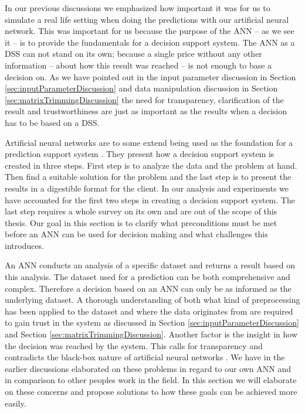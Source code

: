 In our previous discussions we emphasized how important it was for us to simulate a real life setting when doing the predictions with our artificial neural network. This was important for us because the purpose of the ANN -- as we see it -- is to provide the fundamentals for a decision support system. The ANN as a DSS can not stand on its own; because a single price without any other information -- about how this result was reached -- is not enough to base a decision on. As we have pointed out in the input parameter discussion in Section \ref{sec:inputParameterDiscussion} and data manipulation discussion in Section \ref{sec:matrixTrimmingDiscussion} the need for transparency, clarification of the result and trustworthiness are just as important as the results when a decision has to be based on a DSS.

Artificial neural networks are to some extend being used as the foundation for a prediction support system \cite{shim2002past}. They present how a decision support system is created in three steps. First step is to analyze the data and the problem at hand. Then find a suitable solution for the problem and the last step is to present the results in a digestible format for the client. In our analysis and experiments we have accounted for the first two steps in creating a decision support system. The last step requires a whole survey on its own and are out of the scope of this thesis. Our goal in this section is to clarify what preconditions must be met before an ANN can be used for decision making and what challenges this introduces.

An ANN conducts an analysis of a specific dataset and returns a result based on this analysis. The dataset used for a prediction can be both comprehensive and complex. Therefore a decision based on an ANN can only be as informed as the underlying dataset. A thorough understanding of both what kind of preprocessing has been applied to the dataset and where the data originates from are required to gain trust in the system as discussed in Section \ref{sec:inputParameterDiscussion} and Section \ref{sec:matrixTrimmingDiscussion}. Another factor is the insight in how the decision was reached by the system. This calls for transparency and contradicts the black-box nature of artificial neural networks \cite{fromBlackBoxToTransparentBox}. We have in the earlier discussions elaborated on these problems in regard to our own ANN and in comparison to other peoples work in the field. In this section we will elaborate on these concerns and propose solutions to how these goals can be achieved more easily.

